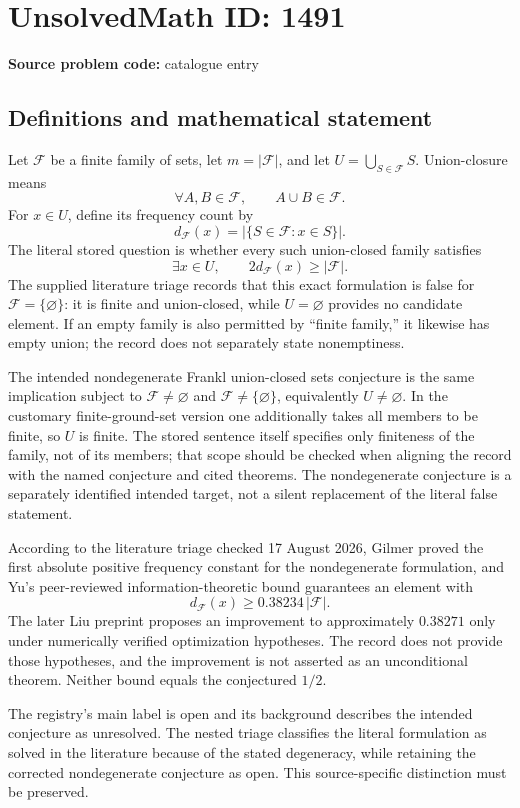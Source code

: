 \documentclass[11pt]{article}
\begin{document}
\section*{UnsolvedMath ID: 1491}
\textbf{Source problem code:} catalogue entry
\subsection{Definitions and mathematical statement}
Let $\mathcal F$ be a finite family of sets, let $m=|\mathcal F|$, and let $U=\bigcup_{S\in\mathcal F}S$. Union-closure means
\[
 \forall A,B\in\mathcal F,\qquad A\cup B\in\mathcal F.
\]
For $x\in U$, define its frequency count by
\[
 d_{\mathcal F}(x)=|\{S\in\mathcal F:x\in S\}|.
\]
The literal stored question is whether every such union-closed family satisfies
\[
 \exists x\in U,\qquad 2d_{\mathcal F}(x)\ge|\mathcal F|.
\]
The supplied literature triage records that this exact formulation is false for $\mathcal F=\{\varnothing\}$: it is finite and union-closed, while $U=\varnothing$ provides no candidate element. If an empty family is also permitted by ``finite family,'' it likewise has empty union; the record does not separately state nonemptiness.

The intended nondegenerate Frankl union-closed sets conjecture is the same implication subject to $\mathcal F\ne\varnothing$ and $\mathcal F\ne\{\varnothing\}$, equivalently $U\ne\varnothing$. In the customary finite-ground-set version one additionally takes all members to be finite, so $U$ is finite. The stored sentence itself specifies only finiteness of the family, not of its members; that scope should be checked when aligning the record with the named conjecture and cited theorems. The nondegenerate conjecture is a separately identified intended target, not a silent replacement of the literal false statement.

According to the literature triage checked 17 August 2026, Gilmer proved the first absolute positive frequency constant for the nondegenerate formulation, and Yu's peer-reviewed information-theoretic bound guarantees an element with
\[
 d_{\mathcal F}(x)\ge0.38234\,|\mathcal F|.
\]
The later Liu preprint proposes an improvement to approximately $0.38271$ only under numerically verified optimization hypotheses. The record does not provide those hypotheses, and the improvement is not asserted as an unconditional theorem. Neither bound equals the conjectured $1/2$.

The registry's main label is open and its background describes the intended conjecture as unresolved. The nested triage classifies the literal formulation as solved in the literature because of the stated degeneracy, while retaining the corrected nondegenerate conjecture as open. This source-specific distinction must be preserved.
\end{document}
